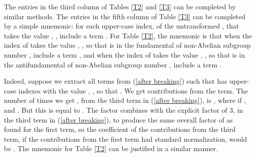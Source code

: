 \documentclass[a4paper,12pt,oneside]{article}
\begin{document}
The entries in the third column of Tables \ref{T2} and \ref{T3} can
be completed by similar methods.  The entries in the fifth column 
of Table \ref{T3} 
can be completed by a simple mnemonic: for each upper-case index, of
the untransformed \coordHE{}, that takes the value \coordHE{}, 
\coordHE{}, include a term \coordHE{}.  For
Table \ref{T2}, the mnemonic is that when the index \coordHE{} of 
\coordHE{} takes the value \coordHE{}, \coordHE{}, so that \coordHE{} is 
in the fundamental of non-Abelian subgroup number \coordHE{}, include a
term \coordHE{}, and when the index \coordHE{} of 
\coordHE{} takes the value \coordHE{}, \coordHE{}, so that \coordHE{} is 
in the antifundamental of non-Abelian subgroup number \coordHE{}, include 
a term \coordHE{}.

Indeed, suppose we extract all terms from
(\ref{after breaking}) such that \coordHE{} has \coordHE{} 
upper-case indexes with the value \coordHE{}, \coordHE{}, so that
\coordHE{}.  We get \coordHE{} 
contributions from the 
\coordHE{} term.  The
number of times we get \coordHE{}, from the third term in
(\ref{after breaking}), is 
\coordHE{}, where
\coordHE{} if \coordHE{}, and \coordHE{}.  But this 
is equal to \coordHE{}.  The factor
\coordHE{} combines with the explicit factor of
3, in the third term in (\ref{after breaking}), to produce the same
overall factor of \coordHE{} as found for the
first term, so the coefficient of the contributions from the third
term, if the contributions from the first term had standard
normalization, would be \coordHE{}.  The mnemonic for Table \ref{T2} can be justified in a
similar manner.
\end{document}
